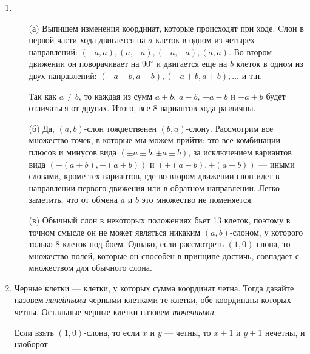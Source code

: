 ﻿

\begin{enumerate}

\item \begin{itemize}
\item[(а)] Выпишем изменения координат, которые происходят при ходе. 
Cлон в первой части хода двигается на $a$ клеток 
в одном из четырех направлений: $(-a,a), (a,-a), (-a,-a), (a,a)$. Во втором 
движении он поворачивает на $90^\circ$ и двигается еще на $b$ клеток в одном
из двух направлений: $(-a-b,a-b), (-a+b,a+b), \ldots$ и т.п.

Так как $a\ne b$, то каждая из сумм $a+b$, $a-b$, $-a-b$ и $-a+b$ будет отличаться
от других. Итого, все 8 вариантов хода различны.

\item[(б)] Да, $(a,b)$-слон тождественен $(b,a)$-слону. Рассмотрим все множество точек,
в которые мы можем прийти: это все комбинации плюсов и минусов вида
$(\pm a \pm b, \pm a \pm b)$, за исключением
вариантов вида $(\pm (a+b), \pm (a+b))$ и $(\pm (a-b), \pm (a-b))$
--- иными словами, кроме тех вариантов, где во втором движении слон идет в направлении
первого движения или в обратном направлении. Легко заметить, что от обмена
$a$ и $b$ это множество не поменяется.

\item[(в)] Обычный слон в некоторых положениях бьет 13 клеток, поэтому в точном смысле он
не может являться никаким $(a,b)$-слоном, у которого только 8 клеток под боем. Однако,
если рассмотреть $(1,0)$-слона, то множество полей, которые он способен в принципе достичь,
совпадает с множеством для обычного слона.
\end{itemize}

\item Черные клетки --- клетки, у которых сумма координат четна. Тогда давайте
назовем \emph{линейными} черными клетками те клетки, обе координаты которых четны. 
Остальные черные клетки назовем \emph{точечными}. 

Если взять $(1,0)$-слона, то если $x$ и $y$ --- четны, то $x \pm 1$ и $y \pm 1$ нечетны,
и наоборот.

\begin{center}\end{center}


\end{enumerate}
